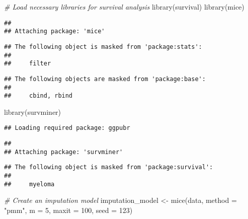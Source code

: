 \documentclass[
]{article}
\newenvironment{Shaded}{\begin{snugshade}}{\end{snugshade}}
\newcommand{\AttributeTok}[1]{\textcolor[rgb]{0.77,0.63,0.00}{#1}}
\newcommand{\CommentTok}[1]{\textcolor[rgb]{0.56,0.35,0.01}{\textit{#1}}}
\newcommand{\DecValTok}[1]{\textcolor[rgb]{0.00,0.00,0.81}{#1}}
\newcommand{\FunctionTok}[1]{\textcolor[rgb]{0.00,0.00,0.00}{#1}}
\newcommand{\NormalTok}[1]{#1}
\newcommand{\OtherTok}[1]{\textcolor[rgb]{0.56,0.35,0.01}{#1}}
\newcommand{\StringTok}[1]{\textcolor[rgb]{0.31,0.60,0.02}{#1}}
\begin{document}
\begin{Shaded}
\begin{Highlighting}[]
\CommentTok{\# Load necessary libraries for survival analysis}
\FunctionTok{library}\NormalTok{(survival)}
\FunctionTok{library}\NormalTok{(mice)}
\end{Highlighting}
\end{Shaded}

\begin{verbatim}
## 
## Attaching package: 'mice'
\end{verbatim}

\begin{verbatim}
## The following object is masked from 'package:stats':
## 
##     filter
\end{verbatim}

\begin{verbatim}
## The following objects are masked from 'package:base':
## 
##     cbind, rbind
\end{verbatim}

\begin{Shaded}
\begin{Highlighting}[]
\FunctionTok{library}\NormalTok{(survminer)}
\end{Highlighting}
\end{Shaded}

\begin{verbatim}
## Loading required package: ggpubr
\end{verbatim}

\begin{verbatim}
## 
## Attaching package: 'survminer'
\end{verbatim}

\begin{verbatim}
## The following object is masked from 'package:survival':
## 
##     myeloma
\end{verbatim}

\begin{Shaded}
\begin{Highlighting}[]
\CommentTok{\# Create an imputation model}
\NormalTok{imputation\_model }\OtherTok{\textless{}{-}} \FunctionTok{mice}\NormalTok{(data, }\AttributeTok{method =} \StringTok{"pmm"}\NormalTok{, }\AttributeTok{m =} \DecValTok{5}\NormalTok{, }\AttributeTok{maxit =} \DecValTok{100}\NormalTok{, }\AttributeTok{seed =} \DecValTok{123}\NormalTok{)}
\end{Highlighting}
\end{Shaded}
\end{document}
